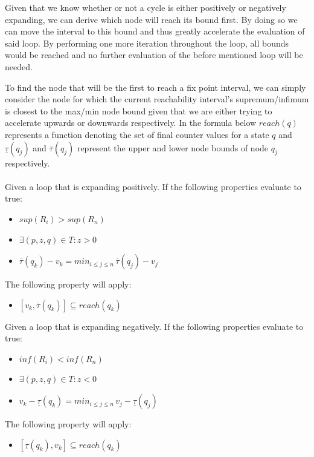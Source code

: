 \documentclass[12pt]{article}
\begin{document}
Given that we know whether or not a cycle is either positively or negatively expanding, we can derive which node will reach its bound first. By doing so we can move the interval to this bound and thus greatly accelerate the evaluation of said loop. By performing one more iteration throughout the loop, all bounds would be reached and no further evaluation of the before mentioned loop will be needed.

To find the node that will be the first to reach a fix point interval, we can simply consider the node for which the current reachability interval's supremum/infimum is closest to the max/min node bound given that we are either trying to accelerate upwards or downwards respectively. In the formula below $reach(q)$ represents a function denoting the set of final counter values for a state $q$ and $\underline{\tau}(q_j)$ and $\overline{\tau}(q_j)$ represent the upper and lower node bounds of node $q_j$ respectively.\\
\\
\noindent
Given a loop that is expanding positively. If the following properties evaluate to true:

\begin{itemize}
	\item $sup(R_i) > sup(R_n)$
	\item $\exists (p, z, q) \in T: z > 0$
	\item $\overline{\tau}(q_k) - v_k = min_{i\leq j \le n}\,\overline{\tau}(q_j) - v_j$
\end{itemize}
The following property will apply:
\begin{itemize}
	\item $[v_k, \overline{\tau}(q_k)] \subseteq reach(q_k)$
\end{itemize}


\noindent
Given a loop that is expanding negatively. If the following properties evaluate to true:

\begin{itemize}
	\item $inf(R_i) < inf(R_n)$
	\item $\exists (p, z, q) \in T: z < 0$
	\item $v_k - \underline{\tau}(q_k) = min_{i\leq j \le n}\,v_j - \underline{\tau}(q_j)$
\end{itemize}
The following property will apply:
\begin{itemize}
	\item $[\underline{\tau}(q_k), v_k] \subseteq reach(q_k)$
\end{itemize}
\end{document}
